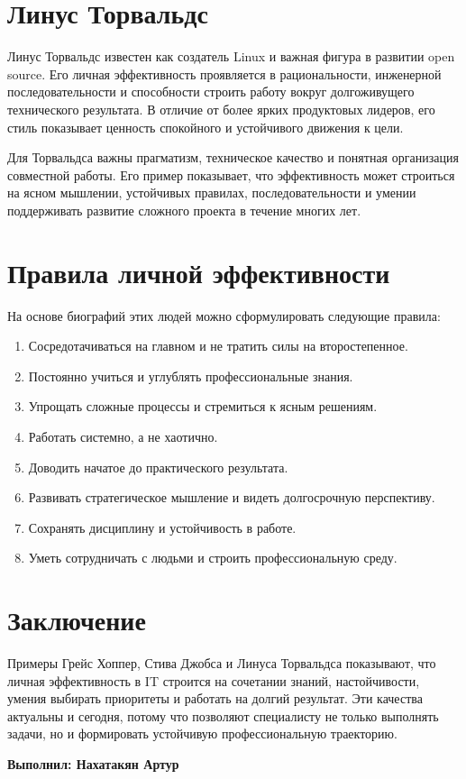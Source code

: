 \documentclass[12pt,a4paper]{article}
\begin{document}
\section*{Линус Торвальдс}

Линус Торвальдс известен как создатель Linux и важная фигура в развитии open source. Его личная эффективность проявляется в рациональности, инженерной последовательности и способности строить работу вокруг долгоживущего технического результата. В отличие от более ярких продуктовых лидеров, его стиль показывает ценность спокойного и устойчивого движения к цели.

Для Торвальдса важны прагматизм, техническое качество и понятная организация совместной работы. Его пример показывает, что эффективность может строиться на ясном мышлении, устойчивых правилах, последовательности и умении поддерживать развитие сложного проекта в течение многих лет.

\section*{Правила личной эффективности}

На основе биографий этих людей можно сформулировать следующие правила:

\begin{enumerate}[label=\arabic*.]
  \item Сосредотачиваться на главном и не тратить силы на второстепенное.
  \item Постоянно учиться и углублять профессиональные знания.
  \item Упрощать сложные процессы и стремиться к ясным решениям.
  \item Работать системно, а не хаотично.
  \item Доводить начатое до практического результата.
  \item Развивать стратегическое мышление и видеть долгосрочную перспективу.
  \item Сохранять дисциплину и устойчивость в работе.
  \item Уметь сотрудничать с людьми и строить профессиональную среду.
\end{enumerate}

\section*{Заключение}

Примеры Грейс Хоппер, Стива Джобса и Линуса Торвальдса показывают, что личная эффективность в IT строится на сочетании знаний, настойчивости, умения выбирать приоритеты и работать на долгий результат. Эти качества актуальны и сегодня, потому что позволяют специалисту не только выполнять задачи, но и формировать устойчивую профессиональную траекторию.

\vspace{1cm}
\textbf{Выполнил: Нахатакян Артур}
\end{document}
